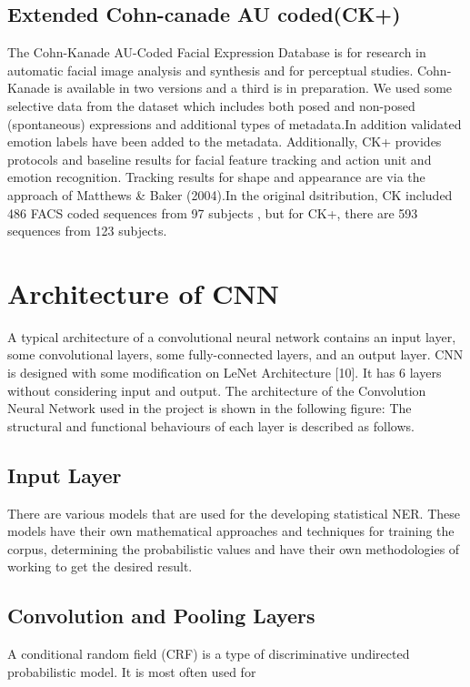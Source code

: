 \documentclass[12pt,a4paper,final]{extreport}
\begin{document}
\subsection{Extended Cohn-canade AU coded(CK+)}
The Cohn-Kanade AU-Coded Facial Expression Database is for research in automatic facial image analysis and synthesis and for perceptual studies. Cohn-Kanade is available in two versions and a third is in preparation. We used some selective data from the dataset  which includes both posed and non-posed (spontaneous) expressions and additional types of metadata.In addition validated emotion labels have been added to the metadata.
\vspace{0.5cm}
Additionally, CK+ provides protocols and baseline results for facial feature tracking and action unit and emotion recognition. Tracking results for shape and appearance are via the approach of Matthews \& Baker (2004).In the original dsitribution, CK included 486 FACS coded sequences from 97 subjects , but for CK+, there are 593 sequences from 123 subjects.

\section{Architecture of CNN}

 A typical architecture of a convolutional neural network contains an input layer, some convolutional layers, some fully-connected layers, and an output layer. CNN is designed with some modification on LeNet Architecture [10]. It has 6 layers without considering input and output. The architecture of the Convolution Neural Network used in the project is shown in the following figure:
\vspace{0.5cm}
The structural and functional behaviours of each layer is described as follows.
 
 \subsection{Input Layer}
 There are various models that are used for the developing statistical NER. These models have their own mathematical approaches and techniques for training the corpus, determining the probabilistic values and have their own methodologies of working to get the desired result.
 \subsection{Convolution and Pooling Layers}
 A conditional random field (CRF) is a type of discriminative
 undirected probabilistic model. It is most often used for
\end{document}
